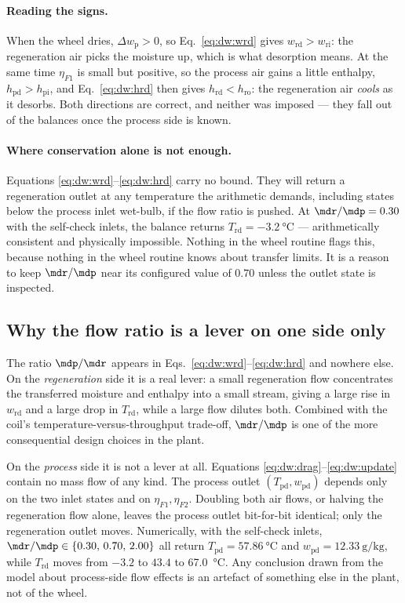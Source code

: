\paragraph{Reading the signs.} When the wheel dries,
$\Delta w_{\mathrm{p}}>0$, so Eq.~\eqref{eq:dw:wrd} gives
$w_{\mathrm{rd}}>w_{\mathrm{ri}}$: the regeneration air picks the moisture up,
which is what desorption means. At the same time $\eta_{F1}$ is small but
positive, so the process air gains a little enthalpy,
$h_{\mathrm{pd}}>h_{\mathrm{pi}}$, and Eq.~\eqref{eq:dw:hrd} then gives
$h_{\mathrm{rd}}<h_{\mathrm{ro}}$: the regeneration air \emph{cools} as it
desorbs. Both directions are correct, and neither was imposed --- they fall
out of the balances once the process side is known.

\paragraph{Where conservation alone is not enough.} Equations
\eqref{eq:dw:wrd}--\eqref{eq:dw:hrd} carry no bound. They will return a
regeneration outlet at any temperature the arithmetic demands, including
states below the process inlet wet-bulb, if the flow ratio is pushed. At
$\mdr/\mdp=0.30$ with the self-check inlets, the balance returns
$T_{\mathrm{rd}}=\SI{-3.2}{\degreeCelsius}$ --- arithmetically consistent and
physically impossible. Nothing in the wheel routine flags this, because
nothing in the wheel routine knows about transfer limits. It is a reason to
keep $\mdr/\mdp$ near its configured value of $0.70$ unless the outlet state
is inspected.

\subsection{Why the flow ratio is a lever on one side only}
\label{sec:dw:lever}

The ratio $\mdp/\mdr$ appears in Eqs.~\eqref{eq:dw:wrd}--\eqref{eq:dw:hrd}
and nowhere else. On the \emph{regeneration} side it is a real lever: a small
regeneration flow concentrates the transferred moisture and enthalpy into a
small stream, giving a large rise in $w_{\mathrm{rd}}$ and a large drop in
$T_{\mathrm{rd}}$, while a large flow dilutes both. Combined with the coil's
temperature-versus-throughput trade-off, $\mdr/\mdp$ is one of the more
consequential design choices in the plant.

On the \emph{process} side it is not a lever at all. Equations
\eqref{eq:dw:drag}--\eqref{eq:dw:update} contain no mass flow of any kind.
The process outlet $(T_{\mathrm{pd}},w_{\mathrm{pd}})$ depends only on the two
inlet states and on $\eta_{F1},\eta_{F2}$. Doubling both air flows, or
halving the regeneration flow alone, leaves the process outlet bit-for-bit
identical; only the regeneration outlet moves. Numerically, with the
self-check inlets, $\mdr/\mdp \in \{0.30,\,0.70,\,2.00\}$ all return
$T_{\mathrm{pd}}=\SI{57.86}{\degreeCelsius}$ and
$w_{\mathrm{pd}}=\SI{12.33}{\gram\per\kilogram}$, while $T_{\mathrm{rd}}$
moves from $-3.2$ to $43.4$ to \SI{67.0}{\degreeCelsius}. Any conclusion
drawn from the model about process-side flow effects is an artefact of
something else in the plant, not of the wheel.

